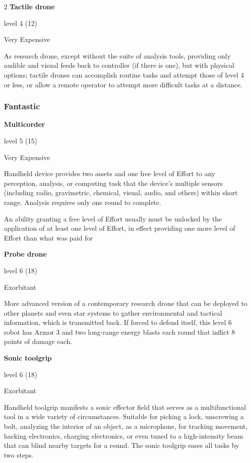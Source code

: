 \begin{multicols}{2}
\textbf{Tactile drone} 

level 4 (12) 

Very Expensive 

As research drone, except without the suite of analysis tools, providing only audible and visual feeds back to controller (if there is one), but with physical options; tactile drones can accomplish routine tasks and attempt those of level 4 or less, or allow a remote operator to attempt more difficult tasks at a distance.

\subsubsection{Fantastic}

\textbf{Multicorder}

level 5 (15) 

Very Expensive 

Handheld device provides two assets and one free level of Effort to any perception, analysis, or computing task that the device’s multiple sensors (including radio, gravimetric, chemical, visual, audio, and others) within short range. Analysis requires only one round to complete. 

An ability granting a free level of Effort usually must be unlocked by the application of at least one level of Effort, in effect providing one more level of Effort than what was paid for

\textbf{Probe drone} 

level 6 (18) 

Exorbitant 

More advanced version of a contemporary research drone that can be deployed to other planets and even star systems to gather environmental and tactical information, which is transmitted back. If forced to defend itself, this level 6 robot has Armor 3 and two long-range energy blasts each round that inflict 8 points of damage each. 

\textbf{Sonic toolgrip}

level 6 (18)

Exorbitant 

Handheld toolgrip manifests a sonic effector field that serves as a multifunctional tool in a wide variety of circumstances. Suitable for picking a lock, unscrewing a bolt, analyzing the interior of an object, as a microphone, for tracking movement, hacking electronics, charging electronics, or even tuned to a high-intensity beam that can blind nearby targets for a round. The sonic toolgrip eases all tasks by two steps.


\end{multicols}
